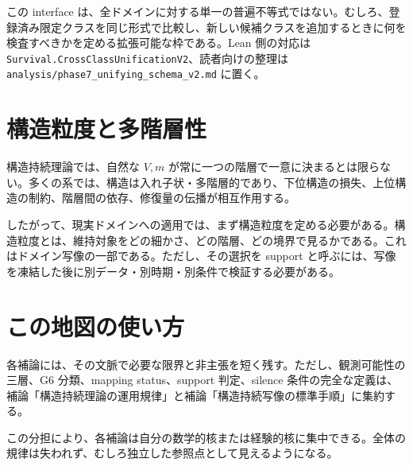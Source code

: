 \documentclass[12pt,a4paper]{article}
\begin{document}
この interface は、全ドメインに対する単一の普遍不等式ではない。むしろ、登録済み限定クラスを同じ形式で比較し、新しい候補クラスを追加するときに何を検査すべきかを定める拡張可能な枠である。Lean 側の対応は \texttt{Survival.CrossClassUnificationV2}、読者向けの整理は \texttt{analysis/phase7\_unifying\_schema\_v2.md} に置く。

\section{構造粒度と多階層性}\label{ux69cbux9020ux7c92ux5ea6ux3068ux591aux968eux5c64ux6027}

構造持続理論では、自然な \(V,m\) が常に一つの階層で一意に決まるとは限らない。多くの系では、構造は入れ子状・多階層的であり、下位構造の損失、上位構造の制約、階層間の依存、修復量の伝播が相互作用する。

したがって、現実ドメインへの適用では、まず構造粒度を定める必要がある。構造粒度とは、維持対象をどの細かさ、どの階層、どの境界で見るかである。これはドメイン写像の一部である。ただし、その選択を support と呼ぶには、写像を凍結した後に別データ・別時期・別条件で検証する必要がある。

\section{この地図の使い方}\label{ux3053ux306eux5730ux56f3ux306eux4f7fux3044ux65b9}

各補論には、その文脈で必要な限界と非主張を短く残す。ただし、観測可能性の三層、G6 分類、mapping status、support 判定、silence 条件の完全な定義は、補論「構造持続理論の運用規律」と補論「構造持続写像の標準手順」に集約する。

この分担により、各補論は自分の数学的核または経験的核に集中できる。全体の規律は失われず、むしろ独立した参照点として見えるようになる。
\end{document}
